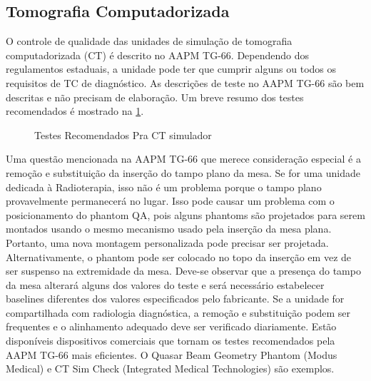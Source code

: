 \documentclass[11pt,a4paper]{article}
\newcounter{exemplo}
\begin{document}
\subsection*{Tomografia Computadorizada}

	O controle de qualidade das unidades de simulação de tomografia computadorizada (CT) é descrito no AAPM TG-66. Dependendo dos regulamentos estaduais, a unidade pode ter que cumprir alguns ou todos os requisitos de TC de diagnóstico. As descrições de teste no AAPM TG-66 são bem descritas e não precisam de elaboração. Um breve resumo dos testes recomendados é mostrado na \ref{fig:qaCtSimulador}.

	\begin{figure}[!h]
		\centering
		\caption{Testes Recomendados Pra CT simulador}
		\label{fig:qaCtSimulador}
	\end{figure}

	Uma questão mencionada na AAPM TG-66 que merece consideração especial é a remoção e substituição da inserção do tampo plano da mesa. Se for uma unidade dedicada à Radioterapia, isso não é um problema porque o tampo plano provavelmente permanecerá no lugar. Isso pode causar um problema com o posicionamento do phantom QA, pois alguns phantoms são projetados para serem montados usando o mesmo mecanismo usado pela inserção da mesa plana. Portanto, uma nova montagem personalizada pode precisar ser projetada. Alternativamente, o phantom pode ser colocado no topo da inserção em vez de ser suspenso na extremidade da mesa. Deve-se observar que a presença do tampo da mesa alterará alguns dos valores do teste e será necessário estabelecer baselines diferentes dos valores especificados pelo fabricante. Se a unidade for compartilhada com radiologia diagnóstica, a remoção e substituição podem ser frequentes e o alinhamento adequado deve ser verificado diariamente. Estão disponíveis dispositivos comerciais que tornam os testes recomendados pela AAPM TG-66 mais eficientes. O Quasar Beam Geometry Phantom (Modus Medical) e CT Sim Check (Integrated Medical Technologies) são exemplos.
\end{document}
